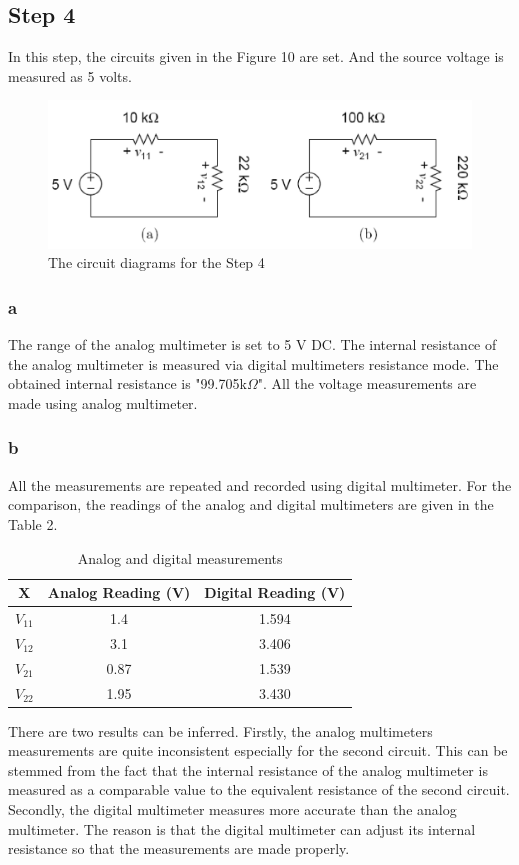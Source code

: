 \documentclass[letterpaper,12pt]{article}
\begin{document}
\subsection{Step 4}
In this step, the circuits given in the Figure 10 are set. And the source voltage is measured as 5 volts. 
\begin{figure}[H]
	\centering
   \includegraphics[width=1\textwidth]{4_sch.png}
   \caption{The circuit diagrams for the Step 4}
\end{figure}  

\subsubsection{a}
The  range of the analog multimeter is set to 5 V DC. The internal resistance of the analog multimeter is measured via digital multimeters resistance mode. The obtained internal resistance is "99.705k\(\Omega\)". All the voltage measurements are made using analog multimeter.
\subsubsection{b}
All the measurements are repeated and recorded using digital multimeter. For the comparison, the readings of the analog and digital multimeters are given in the Table 2.
\begin{table}[H]
	\begin{center}
		\caption{Analog and digital measurements}
		\vspace{2mm}
		\begin{tabular}{||c | c | c||} 
		 \hline 
		 X & Analog Reading (V) & Digital Reading (V) \\ [0.5ex] 
		 \hline\hline
		 \(V_{11}\) & 1.4 & 1.594  \\ 
		 \hline
		 \(V_{12}\) & 3.1 & 3.406  \\
		 \hline
		 \(V_{21}\) & 0.87 & 1.539  \\ 
		 \hline
		 \(V_{22}\) & 1.95 & 3.430  \\
		 \hline
		\end{tabular}
	\end{center}
\end{table}
There are two results can be inferred. Firstly, the analog multimeters measurements are quite inconsistent especially for the second circuit. This can be stemmed from the fact that the internal resistance of the analog multimeter is measured as a comparable value to the equivalent resistance of the second circuit. Secondly, the digital multimeter measures more accurate than the analog multimeter. The reason is that the digital multimeter can adjust its internal resistance so that the measurements are made properly.  
\end{document}
